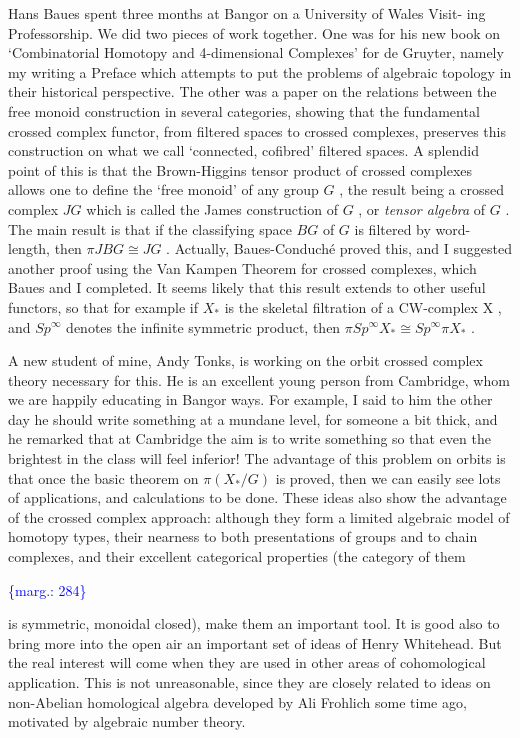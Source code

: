 \documentclass[11pt]{article}
\newcommand{\scanpage}[1]{\par\bigskip\noindent{\small\sffamily[scan #1]}\par}
\newcommand{\mspage}[1]{{\small\sffamily[p.\,#1]}}
\newcommand{\margin}[1]{\textcolor{blue}{\{\textsf{marg.:} #1\}}}
\begin{document}
Hans Baues spent three months at Bangor on a University of Wales Visit-%
ing Professorship. We did two pieces of work together. One was for his new
book on `Combinatorial Homotopy and 4-dimensional Complexes' for de Gruyter,
namely my writing a Preface which attempts to put the problems of algebraic
topology in their historical perspective. The other was a paper on the
relations between the free monoid construction in several categories,
showing that the fundamental crossed complex functor, from filtered spaces
to crossed complexes, preserves this construction on what we call
`connected, cofibred' filtered spaces. A splendid point of this is that the
Brown-Higgins tensor product of crossed complexes allows one to define the
`free monoid' of any group $G$ , the result being a crossed complex $JG$
which is called the James construction of $G$ , or \textit{tensor algebra} of $G$ .
The main result is that if the classifying space $BG$ of $G$ is filtered by
word-length, then $\pi JBG \cong JG$ . Actually, Baues-Conduché proved this, and I
suggested another proof using the Van Kampen Theorem for crossed complexes,
which Baues and I completed. It seems likely that this result extends to
other useful functors, so that for example if $X_*$ is the skeletal
filtration of a CW-complex X , and $Sp^{\infty}$ denotes the infinite symmetric
product, then $\pi Sp^{\infty} X_* \cong Sp^{\infty} \pi X_*$ .

A new student of mine, Andy Tonks, is working on the orbit crossed
complex theory necessary for this. He is an excellent young person from
Cambridge, whom we are happily educating in Bangor ways. For example, I
said to him the other day he should write something at a mundane level, for
someone a bit thick, and he remarked that at Cambridge the aim is to write
something so that even the brightest in the class will feel inferior! The
advantage of this problem on orbits is that once the basic theorem on
$\pi(X_*/G)$ is proved, then we can easily see lots of applications, and
calculations to be done. These ideas also show the advantage of the crossed
complex approach: although they form a limited algebraic model of homotopy
types, their nearness to both presentations of groups and to chain
complexes, and their excellent categorical properties (the category of them

\mspage{3}

\margin{284}

\clearpage
\scanpage{119/285}
is symmetric, monoidal closed), make them an important tool. It is good
also to bring more into the open air an important set of ideas of Henry
Whitehead. But the real interest will come when they are used in other
areas of cohomological application. This is not unreasonable, since they
are closely related to ideas on non-Abelian homological algebra developed by
Ali Frohlich some time ago, motivated by algebraic number theory.
\end{document}
